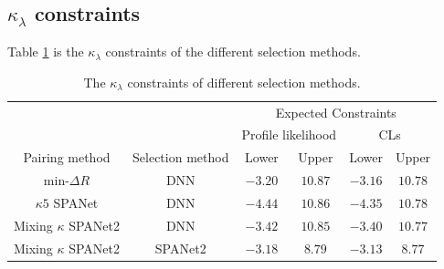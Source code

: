 \documentclass[12pt]{article}
\begin{document}
	\subsection{\texorpdfstring{$\kappa_\lambda$}{kappa} constraints}%
	\label{sub:kappa_constraints}
		Table \ref{tab:kappa_constraint_summary} is the $\kappa_\lambda$ constraints of the different selection methods.
		\begin{table}[htpb]
			\centering
			\caption{The $\kappa_\lambda$ constraints of different selection methods.}
			\label{tab:kappa_constraint_summary}
			\begin{tabular}{cc|cc|cc}
									&                  & \multicolumn{4}{c}{Expected Constraints}                         \\
									&                  & \multicolumn{2}{c}{Profile likelihood} & \multicolumn{2}{c}{CLs} \\ \hline
			Pairing method          & Selection method & Lower              & Upper             & Lower       & Upper     \\ \hline
			$\text{min-}\Delta R$   & DNN              & $-3.20$            & $10.87$           & $-3.16$      & $10.78$    \\
			$\kappa 5$ SPANet       & DNN              & $-4.44$            & $10.86$           & $-4.35$      & $10.78$   \\
			Mixing $\kappa$ SPANet2 & DNN              & $-3.42$            & $10.85$           & $-3.40$      & $10.77$   \\
			Mixing $\kappa$ SPANet2 & SPANet2          & $-3.18$            & $8.79$            & $-3.13$      & $8.77$   
			\end{tabular}		
		\end{table}
	
\end{document}
